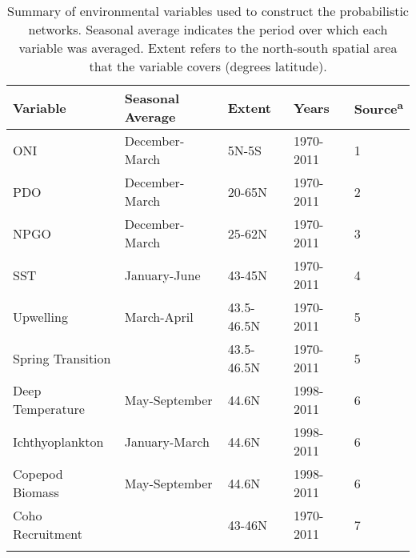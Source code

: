 {\small
\begin{longtable}{lllll}
\caption[Summary of environmental variables used to construct the probabilistic
         networks.]{Summary of environmental variables used to construct the probabilistic
         networks. Seasonal average indicates the period over which each
         variable was averaged. Extent refers to the north-south spatial area
         that the variable covers (degrees latitude).} \\ 
  \hline
Variable & Seasonal Average & Extent & Years & Source\textsuperscript{a} \\ 
  \hline
ONI & December-March & 5N-5S & 1970-2011 & 1 \\ 
  PDO & December-March & 20-65N & 1970-2011 & 2 \\ 
  NPGO & December-March & 25-62N & 1970-2011 & 3 \\ 
  SST & January-June & 43-45N & 1970-2011 & 4 \\ 
  Upwelling & March-April & 43.5-46.5N & 1970-2011 & 5 \\ 
  Spring Transition &  & 43.5-46.5N & 1970-2011 & 5 \\ 
  Deep Temperature & May-September & 44.6N & 1998-2011 & 6 \\ 
  Ichthyoplankton & January-March & 44.6N & 1998-2011 & 6 \\ 
  Copepod Biomass & May-September & 44.6N & 1998-2011 & 6 \\ 
  Coho Recruitment &  & 43-46N & 1970-2011 & 7 \\ 
  \hline
\label{tab:bn:1}
\end{longtable}
}
